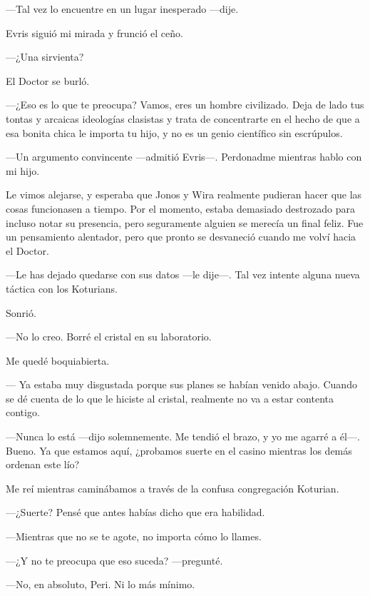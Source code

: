 ---Tal vez lo encuentre en un lugar inesperado ---dije.

Evris siguió mi mirada y frunció el ceño.

---¿Una sirvienta?

El Doctor se burló.

---¿Eso es lo que te preocupa? Vamos, eres un hombre civilizado. Deja de
lado tus tontas y arcaicas ideologías clasistas y trata de concentrarte
en el hecho de que a esa bonita chica le importa tu hijo, y no es un
genio científico sin escrúpulos.

---Un argumento convincente ---admitió Evris---. Perdonadme mientras
hablo con mi hijo.

Le vimos alejarse, y esperaba que Jonos y Wira realmente pudieran hacer
que las cosas funcionasen a tiempo. Por el momento, estaba demasiado
destrozado para incluso notar su presencia, pero seguramente alguien se
merecía un final feliz. Fue un pensamiento alentador, pero que pronto se
desvaneció cuando me volví hacia el Doctor.

---Le has dejado quedarse con sus datos ---le dije---. Tal vez intente
alguna nueva táctica con los Koturians.

Sonrió.

---No lo creo. Borré el cristal en su laboratorio.

Me quedé boquiabierta.

--- Ya estaba muy disgustada porque sus planes se habían venido abajo.
Cuando se dé cuenta de lo que le hiciste al cristal, realmente no va a
estar contenta contigo.

---Nunca lo está ---dijo solemnemente. Me tendió el brazo, y yo me
agarré a él---. Bueno. Ya que estamos aquí, ¿probamos suerte en el
casino mientras los demás ordenan este lío?

Me reí mientras caminábamos a través de la confusa congregación
Koturian.

---¿Suerte? Pensé que antes habías dicho que era habilidad.

---Mientras que no se te agote, no importa cómo lo llames.

---¿Y no te preocupa que eso suceda? ---pregunté.

---No, en absoluto, Peri. Ni lo más mínimo.